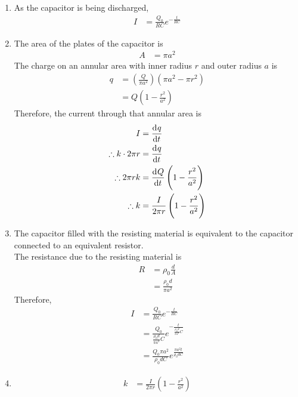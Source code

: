\documentclass[fleqn, a4paper, 12pt, twoside]{article}
\theoremstyle{definition}
\theoremstyle{theorem}
\begin{document}
\begin{solution}
	\begin{enumerate}[leftmargin = *]
		\item
			As the capacitor is being discharged,
			\begin{align*}
				I &= \frac{Q_0}{R C} e^{-\frac{t}{R C}}
			\end{align*}
		\item
			The area of the plates of the capacitor is
			\begin{align*}
				A &= \pi a^2
			\end{align*}
			The charge on an annular area with inner radius $r$ and outer radius $a$ is
			\begin{align*}
				q &= \left( \frac{Q}{\pi a^2} \right) \left( \pi a^2 - \pi r^2 \right)\\
				&= Q \left( 1 - \frac{r^2}{a^2} \right)
			\end{align*}
			Therefore, the current through that annular area is
			\begin{align*}
				I &= \dod{q}{t}\\
				\therefore k \cdot 2 \pi r &= \dod{q}{t}\\
				\therefore 2 \pi r k &= \dod{Q}{t} \left( 1 - \frac{r^2}{a^2} \right)\\
				\therefore k &= \frac{I}{2 \pi r} \left( 1 - \frac{r^2}{a^2} \right)
			\end{align*}
		\item
			The capacitor filled with the resisting material is equivalent to the capacitor connected to an equivalent resistor.\\
			The resistance due to the resisting material is
			\begin{align*}
				R &= \rho_0 \frac{d}{A}\\
				&= \frac{\rho_0 d}{\pi a^2}
			\end{align*}
			Therefore,
			\begin{align*}
				I &= \frac{Q_0}{R C} e^{-\frac{t}{R C}}\\
				&= \frac{Q_0}{\frac{\rho_0 d}{\pi a^2} C} e^{-\frac{t}{\frac{\rho_0 d}{\pi a^2} C}}\\
				&= \frac{Q_0 \pi a^2}{\rho_0 d C} e^{\frac{\pi a^2 t}{\rho_0 d C}}
			\end{align*}
		\item
			\begin{align*}
				k &= \frac{I}{2 \pi r} \left( 1 - \frac{r^2}{a^2} \right)
			\end{align*}
	\end{enumerate}
\end{solution}
\end{document}
